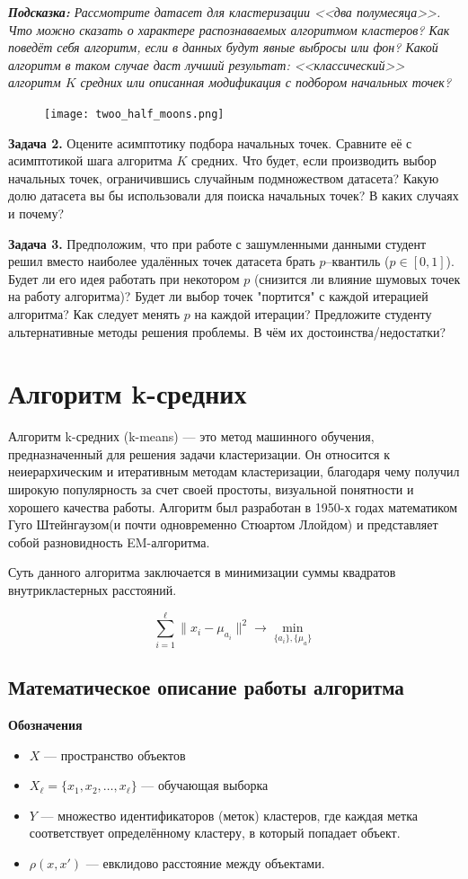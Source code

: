 \textit{\textbf{Подсказка:} Рассмотрите датасет для кластеризации <<два полумесяца>>.
Что можно сказать о характере распознаваемых алгоритмом кластеров?
Как поведёт себя алгоритм, если в данных будут явные выбросы или фон?
Какой алгоритм в таком случае даст лучший результат: <<классический>> алгоритм $K$ средних или описанная модификация с подбором начальных точек?}

\begin{figure}[H]
    \centering
    \texttt{[image: twoo\_half\_moons.png]}
\end{figure}

\textbf{Задача 2.} Оцените асимптотику подбора начальных точек. Сравните её с асимптотикой шага алгоритма $K$ средних.
Что будет, если производить выбор начальных точек, ограничившись случайным подмножеством датасета?
Какую долю датасета вы бы использовали для поиска начальных точек? В каких случаях и почему?

\textbf{Задача 3.} Предположим, что при работе с зашумленными данными студент
решил вместо наиболее удалённых точек датасета брать $p$--квантиль ($p\in [0, 1]$).
Будет ли его идея работать при некотором $p$ (снизится ли влияние шумовых точек на работу алгоритма)?
Будет ли выбор точек "портится" с каждой итерацией алгоритма? Как следует менять $p$ на каждой итерации?
Предложите студенту альтернативные методы решения проблемы. В чём их достоинства/недостатки?

\section{Алгоритм k-средних}

Алгоритм k-средних (k-means) — это метод машинного обучения, предназначенный для решения задачи кластеризации. Он относится к неиерархическим и итеративным методам кластеризации, благодаря чему получил широкую популярность за счет своей простоты, визуальной понятности и хорошего качества работы. Алгоритм был разработан в 1950-х годах математиком Гуго Штейнгаузом(и почти одновременно Стюартом Ллойдом) и представляет собой разновидность EM-алгоритма. 

Суть данного алгоритма заключается в минимизации суммы квадратов внутрикластерных расстояний. 

\[
\sum_{i=1}^\ell \|x_i - \mu_{a_i}\|^2 \to \min_{\{a_i\}, \{\mu_a\}}
\]

\subsection{Математическое описание работы алгоритма}
\textbf{Обозначения}
\begin{itemize}
    \item \( X \) — пространство объектов
    \item \( X_\ell = \{ x_1, x_2, \ldots, x_\ell \} \) — обучающая выборка
    \item \( Y \) — множество идентификаторов (меток) кластеров, где каждая метка соответствует определённому кластеру, в который попадает объект.
    \item \( \rho(x, x') \) — евклидово расстояние между объектами.
\end{itemize}

